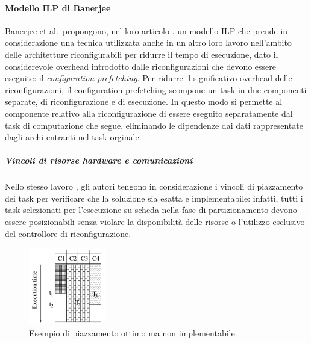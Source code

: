 \paragraph{Modello \acs{ILP} di Banerjee}
\label{par:BanerjeeILP}
Banerjee et al.~propongono, nel loro 
articolo \cite{BanerjeePhysicalConstraints}, un modello \ac{ILP} che prende in
considerazione una tecnica utilizzata anche in un altro loro lavoro 
\cite{BanerjeeReconfigurationOverhead} nell'ambito delle architetture 
riconfigurabili per ridurre il tempo di esecuzione, dato il considerevole 
over\-head introdotto dalle riconfigurazioni che devono essere eseguite: il 
\emph{configuration prefetching}. Per ridurre il significativo overhead delle 
riconfigurazioni, il configuration prefetching scompone un task in due componenti
separate, di riconfigurazione e di esecuzione. In questo modo si permette al componente 
relativo alla riconfigurazione di essere eseguito separatamente dal task di 
computazione che segue, eliminando le dipendenze dai dati rappresentate dagli 
archi entranti nel task orginale.

\subparagraph{Vincoli di risorse hardware e comunicazioni}
Nello stesso lavoro \cite{BanerjeePhysicalConstraints}, gli autori tengono 
in considerazione i vincoli di piazzamento dei task per verificare che la 
soluzione sia esatta e implementabile: infatti, tutti i task selezionati per 
l'esecuzione su scheda nella fase di partizionamento devono essere 
posizionabili senza violare la disponibilità delle risorse o l'utilizzo esclusivo del 
controllore di riconfigurazione.

\begin{figure}[!hb]
 \begin{center}
  \includegraphics[width=0.3\textwidth]
{./capitoli/figure/cap3/InfeasiblePlacement.pdf}
\caption[Piazzamento ottimo non implementabile]{Esempio di piazzamento ottimo 
ma non implementabile.\footnotemark}
\label{fig:infeasiblePlacement}
 \end{center}
\end{figure}


